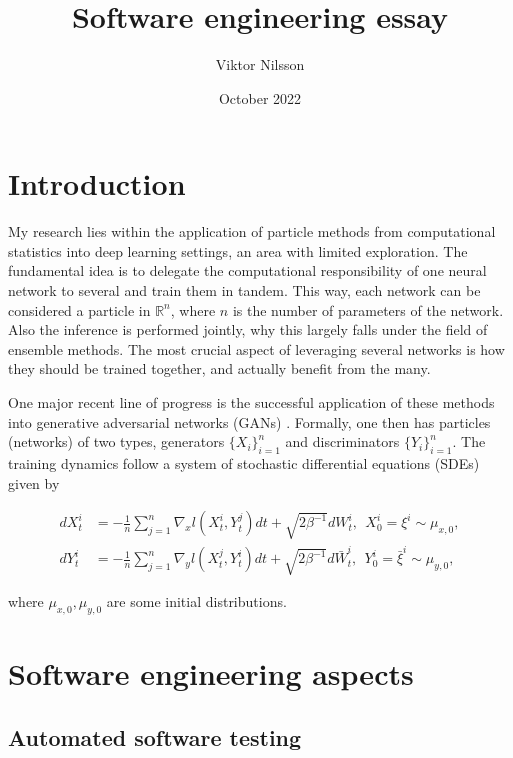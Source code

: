 \documentclass{article}
\title{Software engineering essay}
\author{Viktor Nilsson}
\date{October 2022}
\begin{document}
\maketitle

\section{Introduction}

My research lies within the application of particle methods from computational statistics into deep learning settings, an area with limited exploration.
The fundamental idea is to delegate the computational responsibility of one neural network to several and train them in tandem.
This way, each network can be considered a particle in $\mathbb{R}^n$, where $n$ is the number of parameters of the network.
Also the inference is performed jointly, why this largely falls under the field of ensemble methods.
The most crucial aspect of leveraging several networks is how they should be trained together, and actually benefit from the many.

One major recent line of progress is the successful application of these methods into generative adversarial networks (GANs) \cite{Domingo-Enrich2020Feb}.
Formally, one then has particles (networks) of two types, generators $\{X_i\}_{i=1}^n$ and discriminators $\{Y_i\}_{i=1}^n$.
The training dynamics follow a system of stochastic differential equations (SDEs) given by

\begin{align*}
	dX^i _t &= -\frac{1}{n} \sum _{j=1} ^n \nabla_x l (X^i_t, Y^j _t ) dt + \sqrt{2 \beta ^{-1}} dW^i _t, \ \ X^i _0 = \xi ^i \sim \mu_{x,0}, \\
	dY^i _t &= -\frac{1}{n} \sum _{j=1} ^n \nabla_y l (X^j_t, Y^i _t ) dt + \sqrt{2 \beta ^{-1}} d \bar W^i _t, \ \ Y^i _0 =\bar \xi ^i \sim \mu_{y,0},
\end{align*}

\noindent where $\mu_{x,0}, \mu_{y,0}$ are some initial distributions.

\section{Software engineering aspects}

\subsection{Automated software testing}
\end{document}
